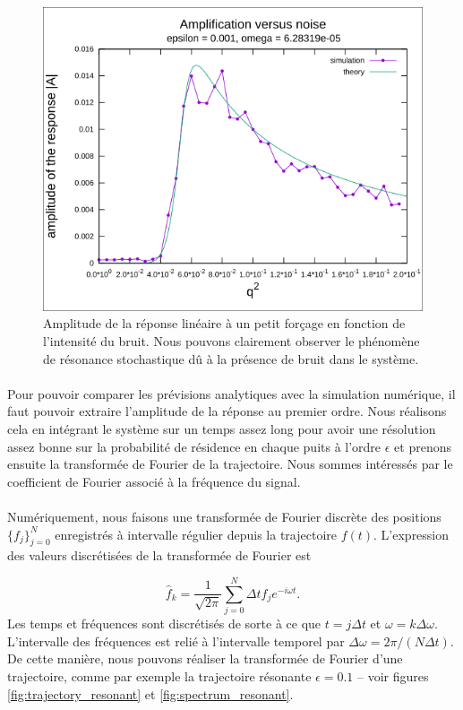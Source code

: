 \begin{figure}
	\centering
	\includegraphics[width=0.8\linewidth]{figures/amplification_versus_noise}
	\caption{Amplitude de la réponse linéaire à un petit forçage en fonction de l'intensité du bruit. Nous pouvons clairement observer le phénomène de résonance stochastique dû à la présence de bruit dans le système.}
	\label{fig:amplification_versus_noise}
\end{figure}

\paragraph{} Pour pouvoir comparer les prévisions analytiques avec la simulation numérique, il faut pouvoir extraire l'amplitude de la réponse au premier ordre. Nous réalisons cela en intégrant le système sur un temps assez long pour avoir une résolution assez bonne sur la probabilité de résidence en chaque puits à l'ordre $\epsilon$ et prenons ensuite la transformée de Fourier de la trajectoire. Nous sommes intéressés par le coefficient de Fourier associé à la fréquence du signal.

\paragraph{} Numériquement, nous faisons une transformée de Fourier discrète des positions $\{f_j\}_{j=0}^N$ enregistrés à intervalle régulier depuis la trajectoire $f(t)$. L'expression des valeurs discrétisées de la  transformée de Fourier est 

\begin{equation}\label{f_hat_k}
	\hat f_k = \frac{1}{\sqrt{2\pi}} \sum_{j=0}^{N} \Delta t f_j e^{-i\omega t}.
\end{equation}
Les temps et fréquences sont discrétisés de sorte à ce que $t=j\Delta t$ et $\omega = k\Delta \omega$. L'intervalle des fréquences est relié à l'intervalle temporel par $\Delta \omega = 2\pi/(N\Delta t)$. De cette manière, nous pouvons réaliser la transformée de Fourier d'une trajectoire, comme par exemple la trajectoire résonante $\epsilon=0.1$ -- voir figures \ref{fig:trajectory_resonant} et \ref{fig:spectrum_resonant}.

